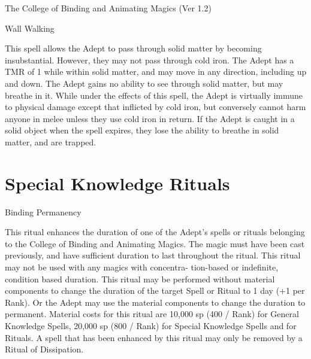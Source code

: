 \begin{Chapter}{The College of Binding and Animating Magics (Ver 1.2)}
\begin{spell}[S-13]{Wall Walking}
\begin{effects}
This spell allows the Adept to pass through solid matter by becoming
insubstantial.  However, they may not pass through cold iron.  The
Adept has a TMR of 1 while within solid matter, and may move in any
direction, including up and down. The Adept gains no ability to see
through solid matter, but may breathe in it.  While under the effects
of this spell, the Adept is virtually immune to physical damage except
that inflicted by cold iron, but conversely cannot harm anyone in
melee unless they use cold iron in return.  If the Adept is caught in
a solid object when the spell expires, they lose the ability to
breathe in solid matter, and are trapped.
\end{effects}
\end{spell}


\section{Special Knowledge Rituals}

\begin{ritual}[R-1]{Binding Permanency}

\begin{effects}
This ritual enhances the duration of one of the Adept’s spells or
rituals belonging to the College of Binding and Animating Magics. The
magic must have been cast previously, and have sufficient duration to
last throughout the ritual.  This ritual may not be used with any
magics with concentra- tion-based or indefinite, condition based
duration.  This ritual may be performed without material components to
change the duration of the target Spell or Ritual to 1 day (+1 per
Rank).  Or the Adept may use the material components to change the
duration to permanent.  Material costs for this ritual are 10,000 sp
(400 / Rank) for General Knowledge Spells, 20,000 sp (800 / Rank) for
Special Knowledge Spells and for Rituals.  A spell that has been
enhanced by this ritual may only be removed by a Ritual of
Dissipation.
\end{effects}
\end{ritual}


\end{Chapter}
